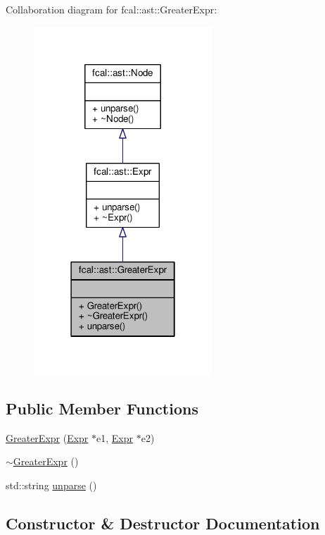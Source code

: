 Collaboration diagram for fcal\+:\+:ast\+:\+:Greater\+Expr\+:
\nopagebreak
\begin{figure}[H]
\begin{center}
\leavevmode
\includegraphics[width=190pt]{classfcal_1_1ast_1_1GreaterExpr__coll__graph}
\end{center}
\end{figure}
\subsection*{Public Member Functions}
\begin{DoxyCompactItemize}
\item 
\hyperlink{classfcal_1_1ast_1_1GreaterExpr_add7bba63f86e25bcbd9c12da1dc712d4}{Greater\+Expr} (\hyperlink{classfcal_1_1ast_1_1Expr}{Expr} $\ast$e1, \hyperlink{classfcal_1_1ast_1_1Expr}{Expr} $\ast$e2)
\item 
\hyperlink{classfcal_1_1ast_1_1GreaterExpr_a42d97746b3f5dabd587a34a411815cbe}{$\sim$\+Greater\+Expr} ()
\item 
std\+::string \hyperlink{classfcal_1_1ast_1_1GreaterExpr_ad5bd1acf689d89841845e14d63e42e16}{unparse} ()
\end{DoxyCompactItemize}


\subsection{Constructor \& Destructor Documentation}
